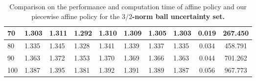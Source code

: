 \documentclass[11pt]{article}
\theoremstyle{plain}
\theoremstyle{definition}
\numberwithin{equation}{section}%
\numberwithin{equation}{section}%
\begin{document}
\begin{table}[]
{\begin{tabular}{|l|l|l|l|l|l|l|l|c|c|}
70  & 1.303 & 1.311 & 1.292 & 1.310 & 1.309 & 1.305 & 1.303 & 0.019 & 267.450 \\\hline
80  & 1.335 & 1.345 & 1.328 & 1.341 & 1.339 & 1.337 & 1.335 & 0.034 & 458.791 \\\hline
90  & 1.363 & 1.372 & 1.353 & 1.370 & 1.369 & 1.366 & 1.363 & 0.044 & 701.262 \\\hline
100 & 1.387 & 1.395 & 1.381 & 1.392 & 1.391 & 1.389 & 1.387 & 0.056 & 967.773 \\\hline
\end{tabular}%
\caption{Comparison on the performance and computation time of affine policy and our piecewise affine policy for the {\bf $3/2$-norm ball uncertainty set.}}
\label{tab:simu:small:ball}}
\end{table}


\end{document}
